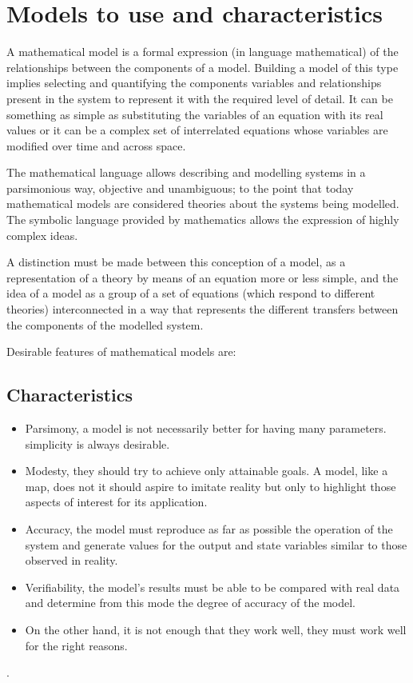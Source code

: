 \documentclass[11pt, letterpaper, english]{article}
\begin{document}
    
\newpage
\section{Models to use and characteristics} 
\par{A mathematical model is a formal expression (in language mathematical) of the relationships between the components of a model. Building a model of this type implies selecting and quantifying the components variables and relationships present in the system to represent it with the required level of detail. It can be something as simple as substituting the variables of an equation with its real values or it can be a complex set of interrelated equations whose variables are modified over time and across space. \cite{Modelos}}
\par{The mathematical language allows describing and modelling systems in a parsimonious way, objective and unambiguous; to the point that today mathematical models are considered theories about the systems being modelled. The symbolic language provided by mathematics allows the expression of highly complex ideas.} \cite{Modelos}
\par{A distinction must be made between this conception of a model, as a representation of a theory by means of an equation more or less simple, and the idea of a model as a group of a set of equations (which respond to different theories) interconnected in a way that represents the different transfers between the components of the modelled system. \cite{Modelos}}
\par{Desirable features of mathematical models are:}
\subsection{Characteristics}
\begin{itemize}
    \item Parsimony, a model is not necessarily better for having many parameters. simplicity is always desirable.
    \item Modesty, they should try to achieve only attainable goals. A model, like a map, does not it should aspire to imitate reality but only to highlight those aspects of interest for its application.
    \item Accuracy, the model must reproduce as far as possible the operation of the system and generate values for the output and state variables similar to those observed in reality.
    \item Verifiability, the model's results must be able to be compared with real data and determine from this mode the degree of accuracy of the model.
    \item  On the other hand, it is not enough that they work well, they must work well for the right reasons.
    \end{itemize}.
\end{document}
